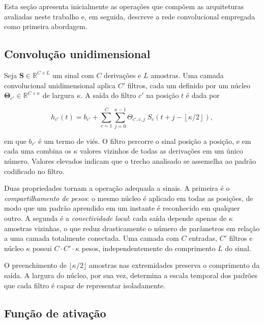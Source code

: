 Esta seção apresenta inicialmente as operações que compõem as arquiteturas
avaliadas neste trabalho e, em seguida, descreve a rede convolucional
empregada como primeira abordagem.

\subsection{Convolução unidimensional}
\label{subsec:fund-convolucao}

Seja $\mathbf{S} \in \mathbb{R}^{C \times L}$ um sinal com $C$ derivações e
$L$ amostras. Uma camada convolucional unidimensional aplica $C'$ filtros,
cada um definido por um núcleo $\boldsymbol{\Theta}_{c'} \in
	\mathbb{R}^{C \times \kappa}$ de largura $\kappa$. A saída do filtro $c'$ na
posição $t$ é dada por

\begin{equation}
	h_{c'}(t) = b_{c'} + \sum_{c=1}^{C} \sum_{j=0}^{\kappa-1}
	\Theta_{c',c,j} \; S_{c}\!\left(t + j - \left\lfloor \kappa/2 \right\rfloor\right),
	\label{eq:convolucao}
\end{equation}

\noindent
em que $b_{c'}$ é um termo de viés. O filtro percorre o sinal posição a
posição, e em cada uma combina os $\kappa$ valores vizinhos de todas as
derivações em um único número. Valores elevados indicam que o trecho
analisado se assemelha ao padrão codificado no filtro.

Duas propriedades tornam a operação adequada a sinais. A primeira é o
\textit{compartilhamento de pesos}: o mesmo núcleo é aplicado em todas as
posições, de modo que um padrão aprendido em um instante é reconhecido em
qualquer outro. A segunda é a \textit{conectividade local}: cada saída
depende apenas de $\kappa$ amostras vizinhas, o que reduz drasticamente o
número de parâmetros em relação a uma camada totalmente conectada. Uma
camada com $C$ entradas, $C'$ filtros e núcleo $\kappa$ possui
$C \cdot C' \cdot \kappa$ pesos, independentemente do comprimento $L$ do
sinal.

O preenchimento de $\lfloor \kappa/2 \rfloor$ amostras nas extremidades
preserva o comprimento da saída. A largura do núcleo, por sua vez, determina
a escala temporal dos padrões que cada filtro é capaz de representar
isoladamente.

\subsection{Função de ativação}
\label{subsec:fund-ativacao}

